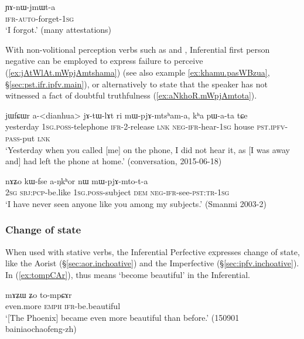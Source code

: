 \begin{exe}
\ex \label{ex:YAnWjmWta}
\gll ɲɤ-nɯ-jmɯt-a \\
 \textsc{ifr}-\textsc{auto}-forget-\textsc{1sg} \\
\glt `I forgot.' (many attestations)
\end{exe}


With non-volitional perception verbs such as  and , Inferential first person negative can be employed to express failure to perceive (\ref{ex:jAtWlAt.mWpjAmtshama}) (see also example \ref{ex:khamu.pasWBzua}, §\ref{sec:pst.ifr.ipfv.main}), or alternatively to state that the speaker has not witnessed a fact of doubtful truthfulness (\ref{ex:aNkhoR.mWpjAmtota}).

\begin{exe}
\ex \label{ex:jAtWlAt.mWpjAmtshama}
\gll jɯfɕɯr a-<dianhua> jɤ-tɯ-lɤt ri mɯ-pjɤ-mtsʰam-a, kʰa pɯ-a-ta tɕe  \\
yesterday \textsc{1sg}.\textsc{poss}-telephone  \textsc{ifr}-2-release \textsc{lnk} \textsc{neg}-\textsc{ifr}-hear-\textsc{1sg} house \textsc{pst}.\textsc{ipfv}-\textsc{pass}-put \textsc{lnk} \\
\glt `Yesterday when you called [me] on the phone, I did not hear it, as [I was away and] had left the phone at home.' (conversation, 2015-06-18)
\end{exe}


\begin{exe}
\ex \label{ex:aNkhoR.mWpjAmtota}
\gll nɤʑo kɯ-fse a-ŋkʰor nɯ mɯ-pjɤ-mto-t-a \\
\textsc{2sg} \textsc{sbj}:\textsc{pcp}-be.like \textsc{1sg}.\textsc{poss}-subject \textsc{dem} \textsc{neg}-\textsc{ifr}-see-\textsc{pst}:\textsc{tr}-\textsc{1sg} \\
\glt `I have never seen anyone like you among my subjects.' (Smanmi 2003-2)
\end{exe}


\subsubsection{Change of state}   \label{sec:ifr.inchoative}
When used with stative verbs, the Inferential Perfective expresses change of state, like the Aorist (§\ref{sec:aor.inchoative}) and the Imperfective (§\ref{sec:ipfv.inchoative}). In (\ref{ex:tompCAr}),  thus means `become beautiful' in the Inferential.

\begin{exe}
\ex \label{ex:tompCAr}
\gll mɤʑɯ ʑo to-mpɕɤr \\
even.more \textsc{emph} \textsc{ifr}-be.beautiful \\
\glt `[The Phoenix] became even more beautiful than before.' (150901 bainiaochaofeng-zh) 
\end{exe}

